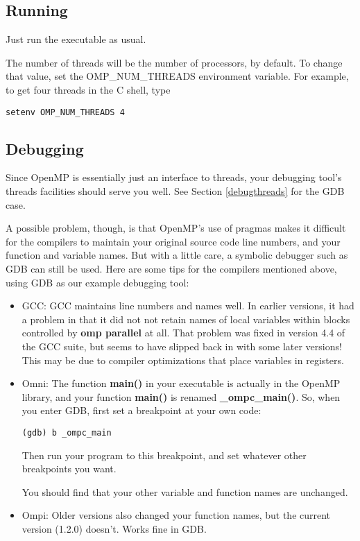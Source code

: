 \subsection{Running}

Just run the executable as usual.

The number of threads will be the number of processors, by default.  To
change that value, set the OMP\_NUM\_THREADS environment variable.  For
example, to get four threads in the C shell, type

\begin{Verbatim}[fontsize=\relsize{-2}]
setenv OMP_NUM_THREADS 4
\end{Verbatim}

\subsection{Debugging}

Since OpenMP is essentially just an interface to threads, your debugging
tool's threads facilities should serve you well.  See Section
\ref{debugthreads} for the GDB case.

A possible problem, though, is that OpenMP's use of pragmas makes it
difficult for the compilers to maintain your original source code line
numbers, and your function and variable names.  But with a little care,
a symbolic debugger such as GDB can still be used.  Here are some tips
for the compilers mentioned above, using GDB as our example debugging
tool:

\begin{itemize}

\item GCC:  GCC maintains line numbers and names well.  In earlier
versions, it had a problem in that it did not not retain names of local
variables within blocks controlled by {\bf omp parallel} at all.
That problem was fixed in version 4.4 of the GCC suite, but seems to
have slipped back in with some later versions!  This may be due to
compiler optimizations that place variables in registers.

\item Omni:  The function {\bf main()} in your executable is actually in
the OpenMP library, and your function {\bf main()} is renamed {\bf
\_ompc\_main()}.  So, when you enter GDB, first set a breakpoint at your
own code:

\begin{Verbatim}[fontsize=\relsize{-2}]
(gdb) b _ompc_main
\end{Verbatim}

Then run your program to this breakpoint, and set whatever other
breakpoints you want.

You should find that your other variable and function names are
unchanged.

\item Ompi: Older versions also changed your function names, but the
current version (1.2.0) doesn't.  Works fine in GDB.

\end{itemize}


